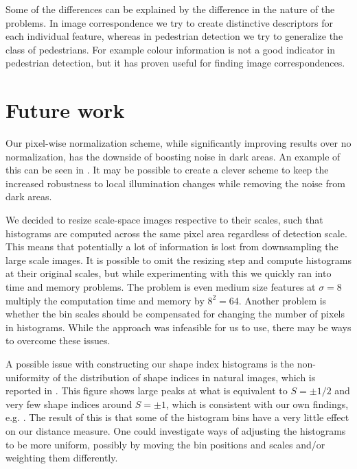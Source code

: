 \documentclass[thesis.tex]{subfiles}
\begin{document}
Some of the differences can be explained by the difference in the nature of the problems. In image correspondence we try to create distinctive descriptors for each individual feature, whereas in pedestrian detection we try to generalize the class of pedestrians. For example colour information is not a good indicator in pedestrian detection, but it has proven useful for finding image correspondences.

\section{Future work} %
%
Our pixel-wise normalization scheme, while significantly improving results over no normalization, has the downside of boosting noise in dark areas. An example of this can be seen in . It may be possible to create a clever scheme to keep the increased robustness to local illumination changes while removing the noise from dark areas.

We decided to resize scale-space images respective to their scales, such that histograms are computed across the same pixel area regardless of detection scale. This means that potentially a lot of information is lost from downsampling the large scale images. It is possible to omit the resizing step and compute histograms at their original scales, but while experimenting with this we quickly ran into time and memory problems. The problem is even medium size features at $\sigma = 8$ multiply the computation time and memory by $8^2 = 64$. Another problem is whether the bin scales should be compensated for changing the number of pixels in histograms. While the approach was infeasible for us to use, there may be ways to overcome these issues.

A possible issue with constructing our shape index histograms is the non-uniformity of the distribution of shape indices in natural images, which is reported in \citep[Fig. 3]{lillholm2009statistics}. This figure shows large peaks at what is equivalent to $S = \pm 1/2$ and very few shape indices around $S = \pm 1$, which is consistent with our own findings, e.g. . The result of this is that some of the histogram bins have a very little effect on our distance measure. One could investigate ways of adjusting the histograms to be more uniform, possibly by moving the bin positions and scales and/or weighting them differently.
\end{document}
